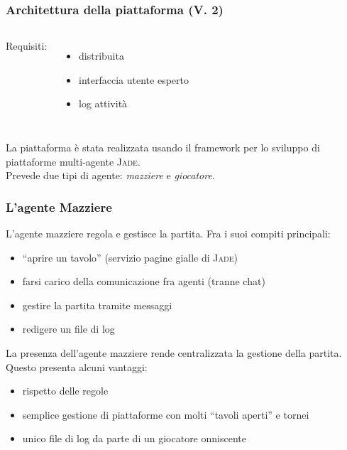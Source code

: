 \documentclass{beamer}
\newcommand*\lista{\item[$\diamondsuit$]}
\begin{document}
\begin{frame}
   \frametitle{Architettura della piattaforma (V. 2)}
   \begin{columns}

   Requisiti:
   \begin{itemize}
      \lista distribuita
      \lista interfaccia utente esperto
      \lista log attività
   \end{itemize}



   \end{columns}
   
   \vfill
   \pause

   La piattaforma è stata realizzata usando il framework per lo sviluppo di piattaforme multi-agente \textsc{Jade}.\\
   Prevede due tipi di agente: \emph{mazziere} e \emph{giocatore}.
   \vfill

\end{frame}




\begin{frame}
   \frametitle{L'agente Mazziere}
   L'agente mazziere regola e gestisce la partita. Fra i suoi compiti principali:
   \begin{itemize}
      \pause
      \lista ``aprire un tavolo'' (servizio pagine gialle di \textsc{Jade})
      \pause
      \lista farsi carico della comunicazione fra agenti (tranne chat)
      \pause
      \lista gestire la partita tramite messaggi
      \pause
      \lista redigere un file di log
   \end{itemize}
   \vfill
   \pause
   La presenza dell'agente mazziere rende centralizzata la gestione della partita. 
   Questo presenta alcuni vantaggi:
   \begin{itemize}
      \pause
      \lista rispetto delle regole
      \pause
      \lista semplice gestione di piattaforme con molti ``tavoli aperti'' e tornei
      \pause
      \lista unico file di log da parte di un giocatore onniscente
   \end{itemize}
\end{frame}
\end{document}
